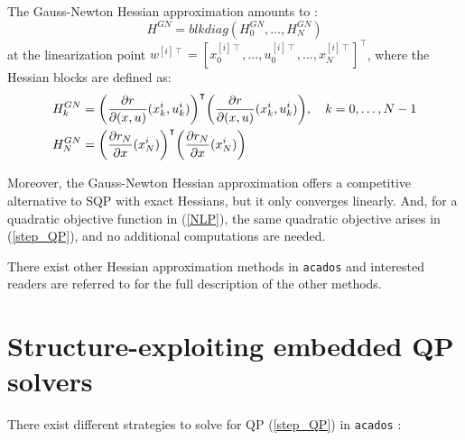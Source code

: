 \documentclass{thesisreport}
\begin{document}
The Gauss-Newton Hessian approximation amounts to \cite{acados2019}:
	\begin{equation}
		H^{GN} = blkdiag(H_0^{GN}, \ldots, H_N^{GN})
	\end{equation}	    
    at the linearization point $w^{[i]\intercal} = [x_0^{[i]\intercal}, \ldots, u_0^{[i] \intercal}, \ldots, x_N^{[i] \intercal}]^{\intercal}$, where the Hessian blocks are defined as:
    \begin{align}
    	H_k^{GN} &= \bigg( \frac{\partial r}{\partial (x,u)} (x_k^i, u_k^i) \bigg)^{\intercal} \bigg( \frac{\partial r}{\partial (x,u)} (x_k^i, u_k^i) \bigg), \text{\space \space \space} k=0,\ldots,N-1 \\
    	H_N^{GN} &= \bigg( \frac{\partial r_N}{\partial x} (x_N^i) \bigg)^{\intercal} \bigg( \frac{\partial r_N}{\partial x} (x_N^i) \bigg)
    \end{align}
    
Moreover, the Gauss-Newton Hessian approximation offers a competitive alternative to SQP with exact Hessians, but it only converges linearly. And, for a quadratic objective function in (\ref{NLP}), the same quadratic objective arises in (\ref{step_QP}), and no additional computations are needed.

There exist other Hessian approximation methods in \texttt{acados} and interested readers are referred to \cite{acados2019} for the full description of the other methods.

\section{Structure-exploiting embedded QP solvers}

There exist different strategies to solve for QP (\ref{step_QP}) in \texttt{acados} \cite{acados2019}:
\end{document}
